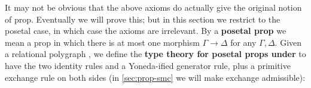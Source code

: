 It may not be obvious that the above axioms do actually give the original notion of prop.
Eventually we will prove this; but in this section we restrict to the posetal case, in which case the axioms are irrelevant.
By a \textbf{posetal prop} we mean a prop in which there is at most one morphism $\Gamma\to\Delta$ for any $\Gamma,\Delta$.
Given a relational polygraph \cG, we define the \textbf{type theory for posetal props under \cG} to have the two identity rules and a Yoneda-ified generator rule, plus a primitive exchange rule on both sides (in \cref{sec:prop-smc} we will make exchange admissible):

